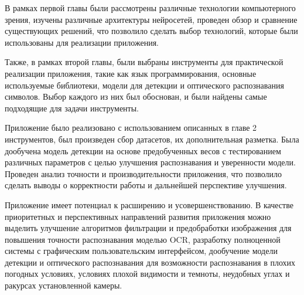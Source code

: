 \documentclass[a4paper,12pt]{article}
\begin{document}
В рамках первой главы были рассмотрены различные технологии компьютерного зрения, изучены различные архитектуры нейросетей, проведен обзор и сравнение существующих решений, что позволило сделать выбор технологий, которые были использованы для реализации приложения.

Также, в рамках второй главы, были выбраны инструменты для практической реализации приложения, такие как язык программирования, основные используемые библиотеки, модели для детекции и оптического распознавания символов. Выбор каждого из них был обоснован, и были найдены самые подходящие для задачи инструменты.

Приложение было реализовано с использованием описанных в главе 2 инструментов, был произведен сбор датасетов, их дополнительная разметка. Была дообучена модель детекции на основе предобученных весов с тестированием различных параметров с целью улучшения распознавания и уверенности модели.
Проведен анализ  точности и производительности приложения, что позволило сделать выводы о корректности работы и дальнейшей перспективе улучшения.

Приложение имеет потенциал к расширению и усовершенствованию. В качестве приоритетных и перспективных направлений развития приложения можно выделить улучшение алгоритмов фильтрации и предобработки изображения для повышения точности распознавания моделью OCR, разработку полноценной системы с графическим пользовательским интерфейсом,  дообучение модели детекции и оптического распознавания для возможности распознавания в плохих погодных условиях, условиях плохой видимости и темноты, неудобных углах и ракурсах установленной камеры.

  
\end{document}

